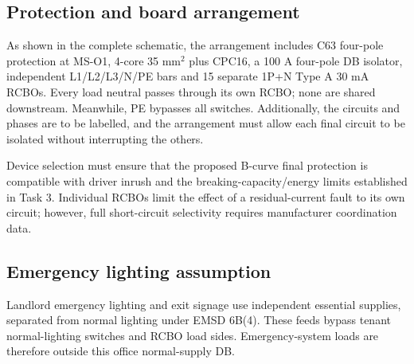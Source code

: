 \subsection*{Protection and board arrangement}
As shown in the complete schematic, the arrangement includes C63 four-pole protection at MS-O1, 4-core 35 mm$^2$ plus CPC16, a 100 A four-pole DB isolator, independent L1/L2/L3/N/PE bars and 15 separate 1P+N Type A 30 mA RCBOs. Every load neutral passes through its own RCBO;  none are shared downstream. Meanwhile, PE bypasses all switches. Additionally, the circuits and phases are to be labelled, and the arrangement must allow each final circuit to be isolated without interrupting the others.

Device selection must ensure that the proposed B-curve final protection is compatible with driver inrush and the breaking-capacity/energy limits established in Task 3. Individual RCBOs limit the effect of a residual-current fault to its own circuit; however, full short-circuit selectivity requires manufacturer coordination data.
\subsection*{Emergency lighting assumption}
Landlord emergency lighting and exit signage use independent essential supplies, separated from normal lighting under EMSD 6B(4). These feeds bypass tenant normal-lighting switches and RCBO load sides. Emergency-system loads are therefore outside this office normal-supply DB.

